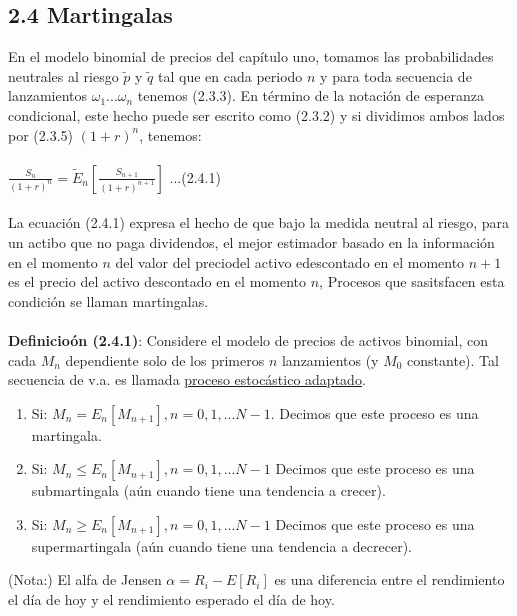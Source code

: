 \documentclass{article}
\begin{document}
        \subsection{2.4 Martingalas}
        En el modelo binomial de precios del capítulo uno, tomamos las probabilidades neutrales al riesgo $\tilde{p}$ y $\tilde{q}$ tal que en cada periodo $n$ y para toda
        secuencia de lanzamientos $\omega_1 ... \omega_n$ tenemos (2.3.3). En término de la notación de esperanza condicional, este hecho puede ser escrito como (2.3.2) y si dividimos ambos
        lados por (2.3.5) $(1+r)^n$, tenemos:
        \\
        \\
        $\frac{S_n}{(1+r)^n} = \tilde{E}_n[\frac{S_{n+1}}{(1 + r)^{n + 1}}]$ ...(2.4.1)
        \\
        \\
        La ecuación (2.4.1) expresa el hecho de que bajo la medida neutral al riesgo, para un actibo que no paga dividendos, el mejor estimador basado en la información en el momento $n$
        del valor del preciodel activo edescontado en el momento $n+1$ es el precio del activo descontado en el momento $n$, Procesos que sasitsfacen esta condición se llaman martingalas.
        \\
        \\
        \textbf{Definicioón (2.4.1)}: Considere el modelo de precios de activos binomial, con cada $M_n$ dependiente solo de los primeros $n$ lanzamientos (y $M_0$ constante).
        Tal secuencia de v.a. es llamada \underline{proceso estocástico adaptado}.
        \\
        \begin{enumerate}
            \item Si: $M_n = E_n[M_{n+1}], n=0, 1, ... N-1$. Decimos que este proceso es una martingala.
            \item Si: $M_n \le E_n[M_{n+1}], n=0, 1, ... N-1$ Decimos que este proceso es una submartingala (aún cuando tiene una tendencia a crecer).
            \item Si: $M_n \ge E_n[M_{n+1}], n=0, 1, ... N-1$ Decimos que este proceso es una supermartingala (aún cuando tiene una tendencia a decrecer).
        \end{enumerate}
        (Nota:) El alfa de Jensen $\alpha = R_i - E[R_i]$ es una diferencia entre el rendimiento el día de hoy y el rendimiento esperado el día de hoy.
\end{document}
